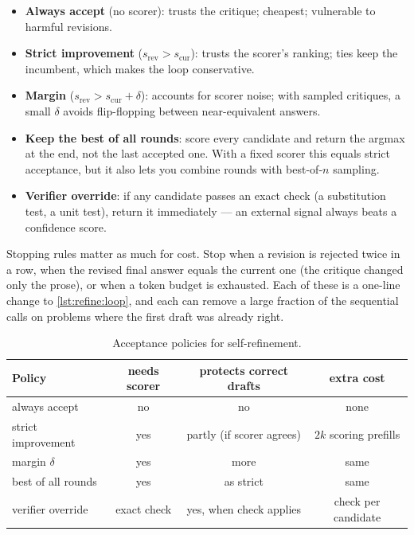\begin{itemize}
  \item \textbf{Always accept} (no scorer): trusts the critique; cheapest; vulnerable to harmful
  revisions.
  \item \textbf{Strict improvement} ($s_{\text{rev}} > s_{\text{cur}}$): trusts the scorer's ranking;
  ties keep the incumbent, which makes the loop conservative.
  \item \textbf{Margin} ($s_{\text{rev}} > s_{\text{cur}} + \delta$): accounts for scorer noise; with
  sampled critiques, a small $\delta$ avoids flip-flopping between near-equivalent answers.
  \item \textbf{Keep the best of all rounds}: score every candidate and return the argmax at the end,
  not the last accepted one. With a fixed scorer this equals strict acceptance, but it also lets you
  combine rounds with best-of-$n$ sampling.
  \item \textbf{Verifier override}: if any candidate passes an exact check (a substitution test, a
  unit test), return it immediately --- an external signal always beats a confidence score.
\end{itemize}

Stopping rules matter as much for cost. Stop when a revision is rejected twice in a row, when the
revised final answer equals the current one (the critique changed only the prose), or when a token
budget is exhausted. Each of these is a one-line change to \cref{lst:refine:loop}, and each can
remove a large fraction of the sequential calls on problems where the first draft was already
right.

\begin{table}[t]
\centering\small
\begin{tabular}{@{}lccc@{}}
\toprule
Policy & needs scorer & protects correct drafts & extra cost \\
\midrule
always accept & no & no & none \\
strict improvement & yes & partly (if scorer agrees) & $2k$ scoring prefills \\
margin $\delta$ & yes & more & same \\
best of all rounds & yes & as strict & same \\
verifier override & exact check & yes, when check applies & check per candidate \\
\bottomrule
\end{tabular}
\caption{Acceptance policies for self-refinement.}
\label{tab:refine:policies}
\end{table}

